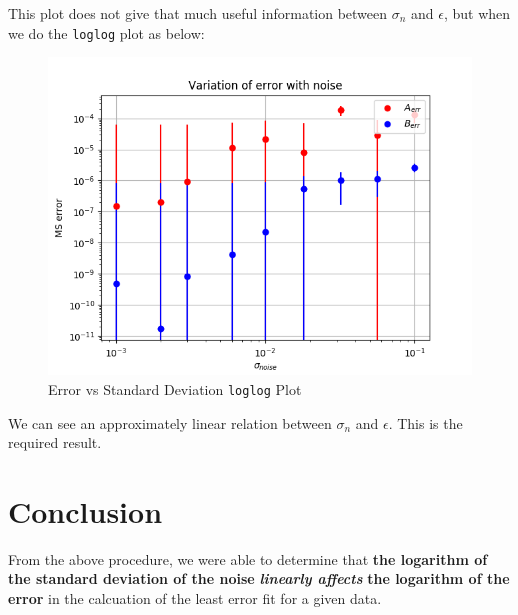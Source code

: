 \documentclass[11pt, a4paper]{article}
\begin{document}
            This plot does not give that much useful information between $\sigma_n$ and $\epsilon$, but when we do the \texttt{loglog} plot as below:
            \begin{figure}[H]
                \centering
                \includegraphics[scale=0.5]{Fig 4.png}  %
                \caption{Error vs Standard Deviation \texttt{loglog} Plot}
                \label{fig:errorSTDloglog}
            \end{figure}

            We can see an approximately linear relation between $\sigma_n$ and $\epsilon$. This is the required result.

    \section{Conclusion}
        From the above procedure, we were able to determine that \textbf{the logarithm of the standard deviation of the noise} \textit{\textbf{linearly affects}} \textbf{the logarithm of the error} in the calcuation of the least error fit for a given data.
\end{document}
